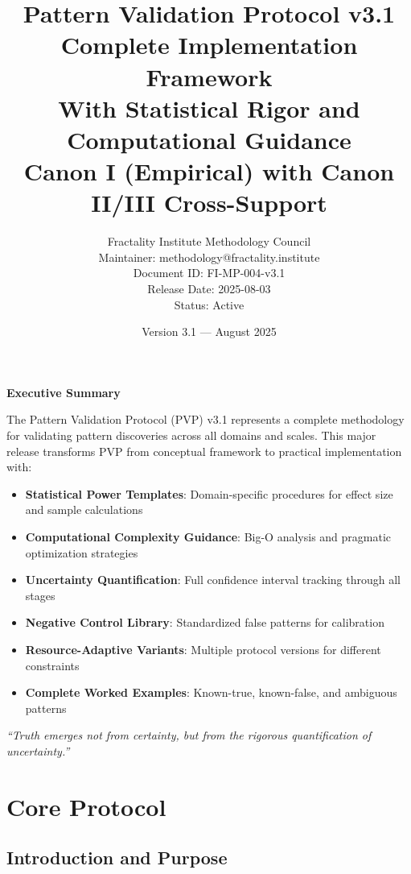 \documentclass[12pt,oneside]{memoir}
\title{\Huge Pattern Validation Protocol v3.1\\[0.5em]
       \LARGE Complete Implementation Framework\\[0.5em]
       \Large With Statistical Rigor and Computational Guidance\\[1em]
       \large Canon I (Empirical) with Canon II/III Cross-Support}
\author{\Large Fractality Institute Methodology Council\\[0.5em]
        \normalsize Maintainer: methodology@fractality.institute\\[1em]
        \normalsize Document ID: FI-MP-004-v3.1\\
        \normalsize Release Date: 2025-08-03\\
        \normalsize Status: Active}
\date{Version 3.1 — August 2025}
\theoremstyle{plain}
\theoremstyle{definition}
\theoremstyle{remark}
\newcommand{\PVP}{\textsc{PVP}}
\begin{document}
\frontmatter
\maketitle

\clearpage
\thispagestyle{empty}
\vspace*{2in}
\begin{center}
\Large\bfseries Executive Summary
\end{center}

\noindent
The Pattern Validation Protocol (\PVP{}) v3.1 represents a complete methodology for validating pattern discoveries across all domains and scales. This major release transforms \PVP{} from conceptual framework to practical implementation with:

\begin{itemize}
\item \textbf{Statistical Power Templates}: Domain-specific procedures for effect size and sample calculations
\item \textbf{Computational Complexity Guidance}: Big-O analysis and pragmatic optimization strategies
\item \textbf{Uncertainty Quantification}: Full confidence interval tracking through all stages
\item \textbf{Negative Control Library}: Standardized false patterns for calibration
\item \textbf{Resource-Adaptive Variants}: Multiple protocol versions for different constraints
\item \textbf{Complete Worked Examples}: Known-true, known-false, and ambiguous patterns
\end{itemize}

\vspace{1em}
\noindent
\large\itshape
``Truth emerges not from certainty, but from the rigorous quantification of uncertainty.''

\clearpage
\tableofcontents
\listoffigures
\listoftables
\listofalgorithms

\mainmatter

\part{Core Protocol}

\chapter{Introduction and Purpose}
\end{document}
